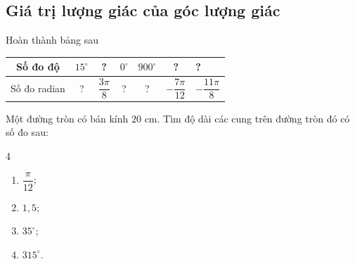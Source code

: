 \begin{bt}
\subsection{Giá trị lượng giác của góc lượng giác}
\begin{bt}%
	Hoàn thành bảng sau
	\begin{center}
	\renewcommand{\arraystretch}{2}
	\begin{tabular}{|c|c|c|c|c|c|l|}
	\hline
	Số đo độ     & $15^\circ$ & ? & $0^\circ$ & $900^\circ$ & ? & ?  \\ \hline
	Số đo radian & ?  & $\dfrac{3\pi}{8}$ & ? & ?   & $-\dfrac{7\pi}{12}$ & $-\dfrac{11\pi}{8}$ \\ \hline
	\end{tabular}
	\end{center}
\end{bt}

\begin{bt}%
	Một đường tròn có bán kính $20$ cm. Tìm độ dài các cung trên đường tròn đó có số đo sau:
	\begin{multicols}{4}
		\begin{enumerate}
			\item $\dfrac{\pi}{12}$;
			\item $1{,}5$;
			\item $35^\circ$;
			\item $315^\circ$.
		\end{enumerate}
	\end{multicols}
\end{bt}


\end{bt}
